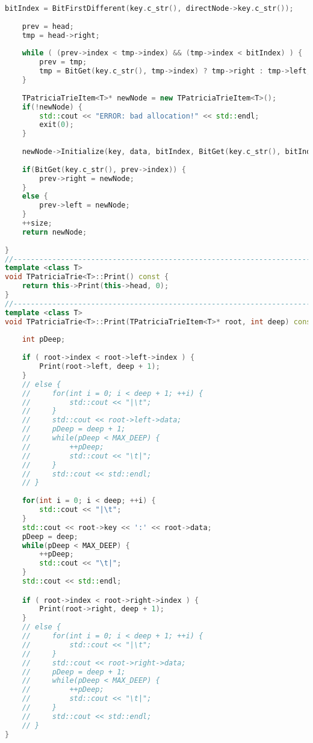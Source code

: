 \begin{lstlisting}[language=C++]
    bitIndex = BitFirstDifferent(key.c_str(), directNode->key.c_str());
    
    prev = head;
    tmp = head->right;
    
    while ( (prev->index < tmp->index) && (tmp->index < bitIndex) ) {
        prev = tmp;
        tmp = BitGet(key.c_str(), tmp->index) ? tmp->right : tmp->left;
    }
    
    TPatriciaTrieItem<T>* newNode = new TPatriciaTrieItem<T>();
    if(!newNode) {
        std::cout << "ERROR: bad allocation!" << std::endl;
        exit(0);
    }
    
    newNode->Initialize(key, data, bitIndex, BitGet(key.c_str(), bitIndex) ? tmp : newNode, BitGet(key.c_str(), bitIndex) ? newNode : tmp);        
    
    if(BitGet(key.c_str(), prev->index)) {
        prev->right = newNode;
    }
    else {
        prev->left = newNode;
    }
    ++size;
    return newNode;
    
}
//----------------------------------------------------------------------------
template <class T>
void TPatriciaTrie<T>::Print() const {
    return this->Print(this->head, 0);
}
//----------------------------------------------------------------------------
template <class T>
void TPatriciaTrie<T>::Print(TPatriciaTrieItem<T>* root, int deep) const {
    
    int pDeep;
    
    if ( root->index < root->left->index ) {
        Print(root->left, deep + 1);
    }
    // else {
    //     for(int i = 0; i < deep + 1; ++i) {
    //         std::cout << "|\t";
    //     }
    //     std::cout << root->left->data;
    //     pDeep = deep + 1;
    //     while(pDeep < MAX_DEEP) {
    //         ++pDeep;
    //         std::cout << "\t|";
    //     }
    //     std::cout << std::endl;
    // }
    
    for(int i = 0; i < deep; ++i) {
        std::cout << "|\t";
    }
    std::cout << root->key << ':' << root->data;
    pDeep = deep;
    while(pDeep < MAX_DEEP) {
        ++pDeep;
        std::cout << "\t|";
    }
    std::cout << std::endl;

    if ( root->index < root->right->index ) {
        Print(root->right, deep + 1);
    }
    // else {
    //     for(int i = 0; i < deep + 1; ++i) {
    //         std::cout << "|\t";
    //     }
    //     std::cout << root->right->data;
    //     pDeep = deep + 1;
    //     while(pDeep < MAX_DEEP) {
    //         ++pDeep;
    //         std::cout << "\t|";
    //     }
    //     std::cout << std::endl;
    // }
}


\end{lstlisting}
